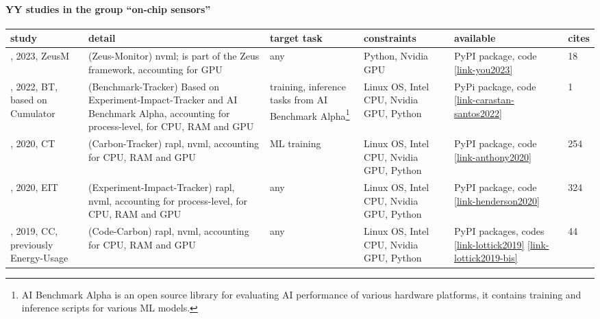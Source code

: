\paragraph{YY studies in the group ``on-chip sensors''} 
 \label{tab:YY-on-chip-sensors} 
\begin{longtable}{|>{\raggedright\arraybackslash}p{2cm}|p{5.9cm}|>{\raggedright\arraybackslash}p{1.85cm}|>{\raggedright\arraybackslash}p{2cm}|>{\raggedright\arraybackslash}p{1.5cm}|p{0.7cm}|}
\toprule
\bfseries study & \bfseries detail & \bfseries target task & \bfseries constraints & \bfseries available & \bfseries cites \\
\midrule 
\endhead
\cite{you2023}, 2023, ZeusM & (Zeus-Monitor) \acrshort{nvml}; is part of the Zeus framework, accounting for GPU & any & Python, Nvidia GPU & PyPI package, code \href{https://github.com/SymbioticLab/Zeus }{\ref*{link-you2023}} & 18 \\
\cite{carastan-santos2022}, 2022, BT, based on Cumulator & (Benchmark-Tracker) Based on Experiment-Impact-Tracker and AI Benchmark Alpha, accounting for process-level, for CPU, RAM and GPU & training, inference tasks from AI Benchmark Alpha\footnote{AI Benchmark Alpha is an open source library for evaluating AI performance of various hardware platforms, it contains training and inference scripts for various ML models.} & Linux OS, Intel CPU, Nvidia GPU, Python & PyPi package, code \href{https://github.com/phamthi1812/Benchmark-Tracker}{\ref*{link-carastan-santos2022}} & 1 \\
\cite{anthony2020}, 2020, CT & (Carbon-Tracker) \acrshort{rapl}, \acrshort{nvml}, accounting for CPU, RAM and GPU & ML training & Linux OS, Intel CPU, Nvidia GPU, Python & PyPI package, code \href{https://github.com/lfwa/carbontracker }{\ref*{link-anthony2020}} & 254 \\
\cite{henderson2020}, 2020, EIT & (Experiment-Impact-Tracker) \acrshort{rapl}, \acrshort{nvml}, accounting for process-level, for CPU, RAM and GPU & any & Linux OS, Intel CPU, Nvidia GPU, Python & PyPI package, code \href{https://github.com/Breakend/experiment-impact-tracker}{\ref*{link-henderson2020}} & 324 \\
\cite{lottick2019}, 2019, CC, previously Energy-Usage & (Code-Carbon) \acrshort{rapl}, \acrshort{nvml}, accounting for CPU, RAM and GPU & any & Linux OS, Intel CPU, Nvidia GPU, Python & PyPI packages, codes \href{https://github.com/responsibleproblemsolving/energy-usage}{\ref*{link-lottick2019}} \href{https://github.com/mlco2/codecarbon}{\ref*{link-lottick2019-bis}} & 44 \\
\bottomrule
\end{longtable}
